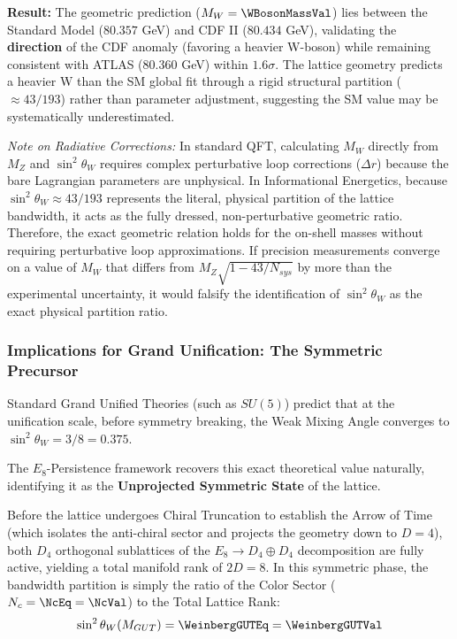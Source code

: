 \textbf{Result:} The geometric prediction ($M_W = \WBosonMassVal$) lies between the Standard Model ($80.357$ GeV) and CDF II ($80.434$ GeV), validating the \textbf{direction} of the CDF anomaly (favoring a heavier W-boson) while remaining consistent with ATLAS ($80.360$ GeV) within $1.6\sigma$. The lattice geometry predicts a heavier W than the SM global fit through a rigid structural partition ($\approx 43/193$) rather than parameter adjustment, suggesting the SM value may be systematically underestimated.

\textit{Note on Radiative Corrections:} In standard QFT, calculating $M_W$ directly from $M_Z$ and $\sin^2\theta_W$ requires complex perturbative loop corrections ($\Delta r$) because the bare Lagrangian parameters are unphysical. In Informational Energetics, because $\sin^2\theta_W \approx 43/193$ represents the literal, physical partition of the lattice bandwidth, it acts as the fully dressed, non-perturbative geometric ratio. Therefore, the exact geometric relation holds for the on-shell masses without requiring perturbative loop approximations. If precision measurements converge on a value of $M_W$ that differs from $M_Z\sqrt{1 - 43/N_{sys}}$ by more than the experimental uncertainty, it would falsify the identification of $\sin^2\theta_W$ as the exact physical partition ratio.

\subsubsection{Implications for Grand Unification: The Symmetric Precursor}

Standard Grand Unified Theories (such as $SU(5)$) predict that at the unification scale, before symmetry breaking, the Weak Mixing Angle converges to $\sin^2 \theta_W = 3/8 = 0.375$. 

The $E_8$-Persistence framework recovers this exact theoretical value naturally, identifying it as the \textbf{Unprojected Symmetric State} of the lattice. 

Before the lattice undergoes Chiral Truncation to establish the Arrow of Time (which isolates the anti-chiral sector and projects the geometry down to $D=4$), both $D_4$ orthogonal sublattices of the $E_8 \to D_4 \oplus D_4$ decomposition are fully active, yielding a total manifold rank of $2D = 8$. In this symmetric phase, the bandwidth partition is simply the ratio of the Color Sector ($N_c = \NcEq = \NcVal$) to the Total Lattice Rank:
\begin{equation}
    \sin^2 \theta_W(M_{GUT}) = \WeinbergGUTEq = \mathbf{\WeinbergGUTVal}
\end{equation}

